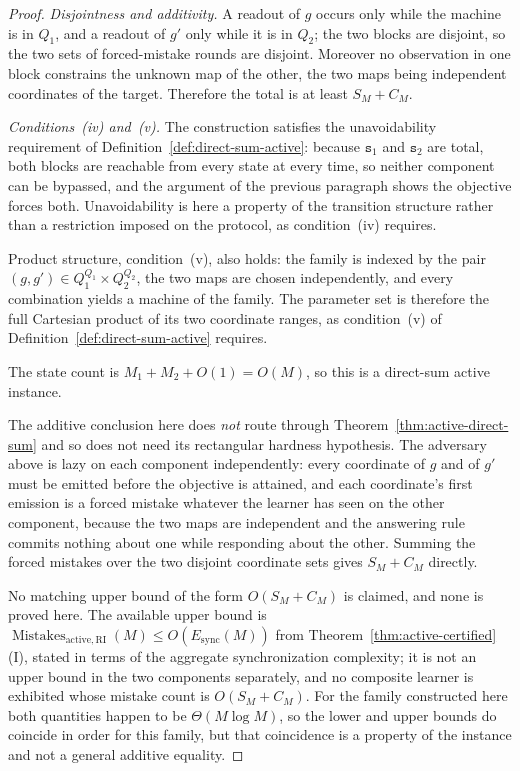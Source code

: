 \documentclass[12pt]{article}
\theoremstyle{definition}
\newcommand{\Esync}{E_{\mathrm{sync}}}
\newcommand{\MistRI}{\operatorname{Mistakes}_{\mathrm{active,RI}}}
\begin{document}
\begin{proof}
\emph{Disjointness and additivity.}  A readout of $g$ occurs only while the
machine is in $Q_1$, and a readout of $g'$ only while it is in $Q_2$; the two
blocks are disjoint, so the two sets of forced-mistake rounds are disjoint.
Moreover no observation in one block constrains the unknown map of the other,
the two maps being independent coordinates of the target.  Therefore the total
is at least $S_M+C_M$.

\emph{Conditions~(iv) and~(v).}  The construction satisfies the unavoidability
requirement of Definition~\ref{def:direct-sum-active}: because $\mathtt s_1$
and $\mathtt s_2$ are total, both blocks are reachable from every state at
every time, so neither component can be bypassed, and the argument of the
previous paragraph shows the objective forces both.  Unavoidability is here a
property of the transition structure rather than a restriction imposed on the
protocol, as condition~(iv) requires.

Product structure, condition~(v), also holds: the family is indexed by the pair
$(g,g')\in Q_1^{Q_1}\times Q_2^{Q_2}$, the two maps are chosen independently,
and every combination yields a machine of the family.  The parameter set is
therefore the full Cartesian product of its two coordinate ranges, as
condition~(v) of Definition~\ref{def:direct-sum-active} requires.

The state count is $M_1+M_2+O(1)=O(M)$, so this is a direct-sum active
instance.

The additive conclusion here does \emph{not} route through
Theorem~\ref{thm:active-direct-sum} and so does not need its rectangular
hardness hypothesis.  The adversary above is lazy on each component
independently: every coordinate of $g$ and of $g'$ must be emitted before the
objective is attained, and each coordinate's first emission is a forced mistake
whatever the learner has seen on the other component, because the two maps are
independent and the answering rule commits nothing about one while responding
about the other.  Summing the forced mistakes over the two disjoint coordinate
sets gives $S_M+C_M$ directly.

No matching upper bound of the form $O(S_M+C_M)$ is claimed, and none is
proved here.  The available upper bound is
$\MistRI(M)\le O(\Esync(M))$ from Theorem~\ref{thm:active-certified}(I), stated
in terms of the aggregate synchronization complexity; it is not an upper bound
in the two components separately, and no composite learner is exhibited whose
mistake count is $O(S_M+C_M)$.  For the family constructed here both
quantities happen to be $\Theta(M\log M)$, so the lower and upper bounds do
coincide in order for this family, but that coincidence is a property of the
instance and not a general additive equality.
\end{proof}
\end{document}
